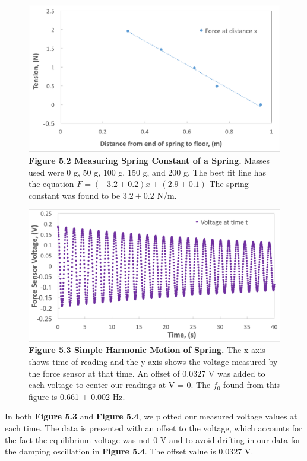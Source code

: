 \documentclass[11pt]{report}
\begin{document}
\begin{figure}
    \includegraphics[width=\linewidth]{ForceDistance.png}
    \captionsetup{labelformat=empty}
    \caption{\textbf{Figure 5.2 Measuring Spring Constant of a Spring.}  Masses
    used were 0 g, 50 g, 100 g, 150 g, and 200 g.  The best fit line has the
    equation \(F = (-3.2 \pm 0.2)x + (2.9 \pm 0.1)\) The spring constant was found to be \(3.2 \pm
0.2\) N/m.}
\end{figure}

\begin{figure}
    \includegraphics[width=\linewidth]{VoltageTime1.png}
    \captionsetup{labelformat=empty}
    \caption{\textbf{Figure 5.3 Simple Harmonic Motion of Spring.} The x-axis
    shows time of reading and the y-axis shows the voltage measured by the force
sensor at that time. An offset of 0.0327 V was added to each voltage to center
our readings at V = 0. The \(f_0\) found from this figure is 0.661 $\pm$ 0.002 Hz.}
\end{figure}

In both \textbf{Figure 5.3} and \textbf{Figure 5.4}, we plotted our measured
voltage values at each time. The data is presented with
an offset to the voltage, which accounts for the fact the equilibrium voltage
was not 0 V and to avoid drifting in our data for the damping oscillation in
\textbf{Figure 5.4}.  The offset value is 0.0327 V.
\end{document}
